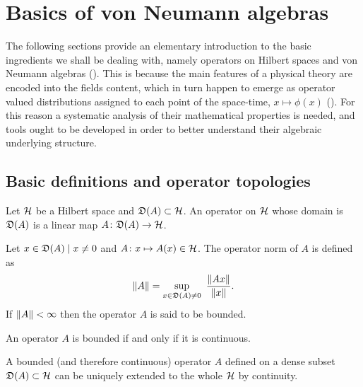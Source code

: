 \chapter{Basics of von Neumann algebras}\label{ch:von Neumann}
\minitoc\mtcskip

\noindent The following sections provide an elementary
introduction to the basic ingredients we shall be dealing 
with, namely operators on Hilbert spaces and von Neumann
algebras (\cite*{Jones:vN}). This is because the main features 
of a physical theory are encoded into the fields content, 
which in turn happen to emerge as operator valued distributions 
assigned to each point of the space-time, $x\mapsto\phi(x)$ 
(\cite*{Haag}). For this reason a systematic analysis of 
their mathematical properties is needed, and tools ought to 
be developed in order to better understand their algebraic 
underlying structure.


\section{Basic definitions and operator topologies}
\label{Operator topologies}
Let $\mathcal{H}$ be a Hilbert space and $\mathfrak{D}(A)\subset\mathcal{H}$.
An operator on $\mathcal{H}$ whose domain is $\mathfrak{D}(A)$ is 
a linear map $A\colon\mathfrak{D}(A)\to\mathcal{H}$.

 \begin{definition}
 Let $x\in\mathfrak{D}(A)\mid x\neq 0$ and $A\colon x\mapsto A(x)\in\mathcal{H}$.
 The operator norm of $A$ is defined as
 \begin{equation}
 \label{oper_norm}
 \norm{A}=\sup_{x\in\dom{A}\neq 0}\ 
 \frac{\norm{Ax}}{\norm{x}}.
 \end{equation}
 If $\lVert A\rVert<\infty$ then the operator $A$ is said
 to be bounded.
 \end{definition}
 
 \begin{property}
 An operator $A$ is bounded if and only if it is continuous.
 \end{property}
 
 \begin{property}
 A bounded (and therefore continuous) operator $A$ defined
 on a dense subset $\mathfrak{D}(A)\subset\mathcal{H}$ can be uniquely extended
 to the whole $\mathcal{H}$ by continuity.
 \end{property}
 
